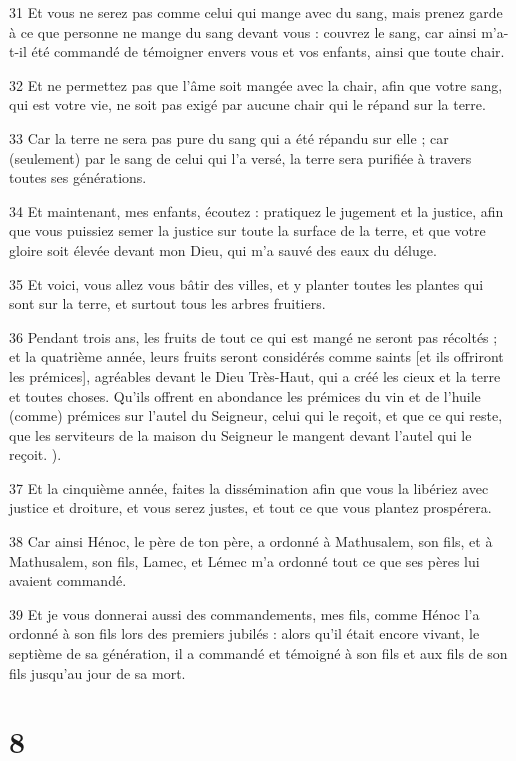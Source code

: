 \par 31 Et vous ne serez pas comme celui qui mange avec du sang, mais prenez garde à ce que personne ne mange du sang devant vous : couvrez le sang, car ainsi m'a-t-il été commandé de témoigner envers vous et vos enfants, ainsi que toute chair.
\par 32 Et ne permettez pas que l'âme soit mangée avec la chair, afin que votre sang, qui est votre vie, ne soit pas exigé par aucune chair qui le répand sur la terre.
\par 33 Car la terre ne sera pas pure du sang qui a été répandu sur elle ; car (seulement) par le sang de celui qui l'a versé, la terre sera purifiée à travers toutes ses générations.
\par 34 Et maintenant, mes enfants, écoutez : pratiquez le jugement et la justice, afin que vous puissiez semer la justice sur toute la surface de la terre, et que votre gloire soit élevée devant mon Dieu, qui m'a sauvé des eaux du déluge.
\par 35 Et voici, vous allez vous bâtir des villes, et y planter toutes les plantes qui sont sur la terre, et surtout tous les arbres fruitiers.
\par 36 Pendant trois ans, les fruits de tout ce qui est mangé ne seront pas récoltés ; et la quatrième année, leurs fruits seront considérés comme saints [et ils offriront les prémices], agréables devant le Dieu Très-Haut, qui a créé les cieux et la terre et toutes choses. Qu'ils offrent en abondance les prémices du vin et de l'huile (comme) prémices sur l'autel du Seigneur, celui qui le reçoit, et que ce qui reste, que les serviteurs de la maison du Seigneur le mangent devant l'autel qui le reçoit. ).
\par 37 Et la cinquième année, faites la dissémination afin que vous la libériez avec justice et droiture, et vous serez justes, et tout ce que vous plantez prospérera.
\par 38 Car ainsi Hénoc, le père de ton père, a ordonné à Mathusalem, son fils, et à Mathusalem, son fils, Lamec, et Lémec m'a ordonné tout ce que ses pères lui avaient commandé.
\par 39 Et je vous donnerai aussi des commandements, mes fils, comme Hénoc l'a ordonné à son fils lors des premiers jubilés : alors qu'il était encore vivant, le septième de sa génération, il a commandé et témoigné à son fils et aux fils de son fils jusqu'au jour de sa mort.

\chapter{8}

